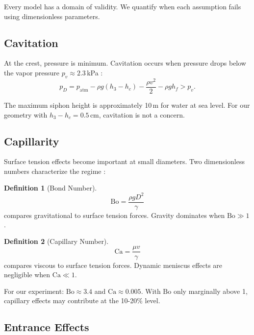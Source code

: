 \documentclass[11pt,a4paper]{article}
\theoremstyle{definition}
\newtheorem{definition}{Definition}
\begin{document}
Every model has a domain of validity. We quantify when each assumption fails using dimensionless parameters.

\subsection{Cavitation}

At the crest, pressure is minimum. Cavitation occurs when pressure drops below the vapor pressure $p_v \approx 2.3$\,kPa \citep{brennen1995cavitation}:
\begin{equation}
  p_D = p_{\text{atm}} - \rho g(h_3 - h_c) - \frac{\rho v^2}{2} - \rho g h_f > p_v.
  \label{eq:cavitation}
\end{equation}

The maximum siphon height is approximately 10\,m for water at sea level. For our geometry with $h_3 - h_c = 0.5$\,cm, cavitation is not a concern.

\subsection{Capillarity}

Surface tension effects become important at small diameters. Two dimensionless numbers characterize the regime \citep{degennes2004capillarity}:

\begin{definition}[Bond Number]
\begin{equation}
  \text{Bo} = \frac{\rho g D^2}{\gamma}
  \label{eq:bond}
\end{equation}
compares gravitational to surface tension forces. Gravity dominates when $\text{Bo} \gg 1$.
\end{definition}

\begin{definition}[Capillary Number]
\begin{equation}
  \text{Ca} = \frac{\mu v}{\gamma}
  \label{eq:capillary}
\end{equation}
compares viscous to surface tension forces. Dynamic meniscus effects are negligible when $\text{Ca} \ll 1$.
\end{definition}

For our experiment: $\text{Bo} \approx 3.4$ and $\text{Ca} \approx 0.005$. With $\text{Bo}$ only marginally above 1, capillary effects may contribute at the 10-20\% level.

\subsection{Entrance Effects}
\end{document}

